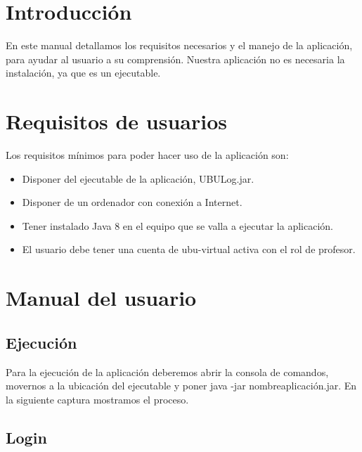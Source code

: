 
\section{Introducción}

En este manual detallamos los requisitos necesarios y el manejo de la aplicación, para ayudar al usuario a su comprensión. Nuestra aplicación no es necesaria la instalación, ya que es un ejecutable.

\section{Requisitos de usuarios}

Los requisitos mínimos para poder hacer uso de la aplicación son:

\begin{itemize}
	\tightlist
	\item
	Disponer del ejecutable de la aplicación, UBULog.jar.
	\item
	Disponer de un ordenador con conexión a Internet.
	\item
	Tener instalado Java 8 en el equipo que se valla a ejecutar la aplicación.
	\item
	El usuario debe tener una cuenta de ubu-virtual activa con el rol de profesor.
\end{itemize}


\section{Manual del usuario}

\subsection{Ejecución}


Para la ejecución de la aplicación deberemos abrir la consola de comandos, movernos a la ubicación del ejecutable y poner java -jar nombreaplicación.jar. En la siguiente captura mostramos el proceso.


\subsection{Login}


